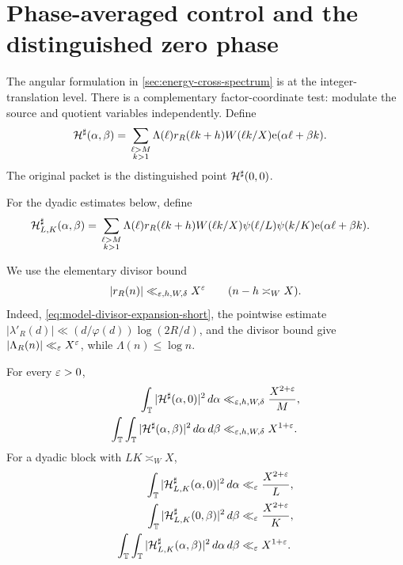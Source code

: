 \section{Phase-averaged control and the distinguished zero phase}
\label{sec:phase-masks}

The angular formulation in \cref{sec:energy-cross-spectrum} is at the
integer-translation level.  There is a complementary factor-coordinate
test: modulate the source and quotient variables independently.  Define
\begin{align}
 \mathcal H^\sharp(\alpha,\beta)
 ={}&\sum_{\substack{\ell>M\\k>1}}
 \Lambda(\ell)r_R(\ell k+h)W(\ell k/X)
 \mathrm e(\alpha\ell+\beta k).
 \label{eq:two-phase-hard-packet}
\end{align}
The original packet is the distinguished point
$\mathcal H^\sharp(0,0)$.

For the dyadic estimates below, define
\begin{align}
 \mathcal H^\sharp_{L,K}(\alpha,\beta)
 ={}&\sum_{\substack{\ell>M\\k>1}}
 \Lambda(\ell)r_R(\ell k+h)W(\ell k/X)
 \psi(\ell/L)\psi(k/K)
 \mathrm e(\alpha\ell+\beta k).
 \label{eq:dyadic-two-phase-packet}
\end{align}

We use the elementary divisor bound
\begin{equation}
 |r_R(n)|\ll_{\varepsilon,h,W,\delta}X^\varepsilon
 \qquad(n-h\asymp_WX).
 \label{eq:residual-pointwise-divisor-bound}
\end{equation}
Indeed, \eqref{eq:model-divisor-expansion-short}, the pointwise estimate
$|\lambda'_R(d)|\ll(d/\varphi(d))\log(2R/d)$, and the divisor bound give
$|\Lambda_R(n)|\ll_\varepsilon X^\varepsilon$, while
$\Lambda(n)\le\log n$.

\begin{theorem}
\label{thm:factor-phase-mean-squares}
For every $\varepsilon>0$,
\begin{align}
 \int_\mathbb T|\mathcal H^\sharp(\alpha,0)|^2\,d\alpha
 &\ll_{\varepsilon,h,W,\delta}\frac{X^{2+\varepsilon}}M,
 \label{eq:one-phase-mean-square}\\
 \int_\mathbb T\int_\mathbb T|\mathcal H^\sharp(\alpha,\beta)|^2
 \,d\alpha\,d\beta
 &\ll_{\varepsilon,h,W,\delta}X^{1+\varepsilon}.
 \label{eq:two-phase-mean-square}
\end{align}
For a dyadic block with $LK\asymp_WX$,
\begin{align}
 \int_\mathbb T|\mathcal H^\sharp_{L,K}(\alpha,0)|^2\,d\alpha
 &\ll_\varepsilon\frac{X^{2+\varepsilon}}L,
 \label{eq:dyadic-row-phase}\\
 \int_\mathbb T|\mathcal H^\sharp_{L,K}(0,\beta)|^2\,d\beta
 &\ll_\varepsilon\frac{X^{2+\varepsilon}}K,
 \label{eq:dyadic-quotient-phase}\\
 \int_\mathbb T\int_\mathbb T|\mathcal H^\sharp_{L,K}(\alpha,\beta)|^2
 \,d\alpha\,d\beta
 &\ll_\varepsilon X^{1+\varepsilon}.
 \label{eq:dyadic-two-phase}
\end{align}
\end{theorem}

